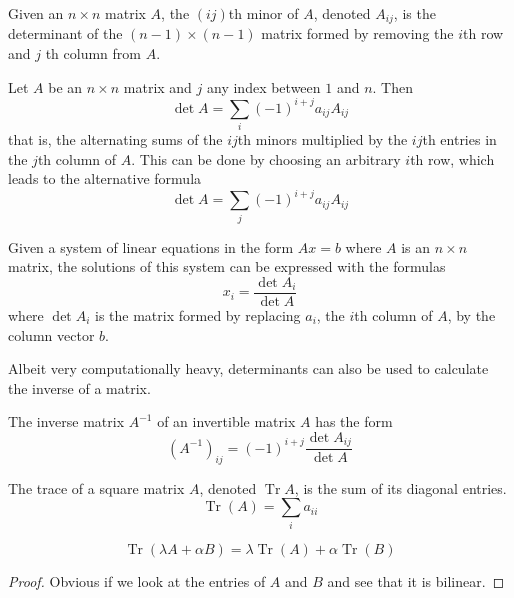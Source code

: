 \documentclass{article}
\DeclareMathOperator{\Tr}{Tr}
\begin{document}
  \begin{definition}
  Given an $n \times n$ matrix $A$, the $(i j)$th minor of $A$, denoted $A_{i j}$, is the determinant of the $(n-1) \times (n-1)$ matrix formed by removing the $i$th row and $j$ th column from $A$. 
  \end{definition}

  \begin{theorem}
  Let $A$ be an $n \times n$ matrix and $j$ any index between $1$ and $n$. Then
  \[\det{A} = \sum_i (-1)^{i + j} a_{i j} A_{i j}\]
  that is, the alternating sums of the $ij$th minors multiplied by the $ij$th entries in the $j$th column of $A$. This can be done by choosing an arbitrary $i$th row, which leads to the alternative formula 
  \[\det{A} = \sum_j (-1)^{i + j} a_{i j} A_{i j} \]
  \end{theorem}

  \begin{theorem}
  Given a system of linear equations in the form $A x = b$ where $A$ is an $n \times n$ matrix, the solutions of this system can be expressed with the formulas 
  \[ x_i = \frac{ \det{A_i}}{\det{A}}\]
  where $\det{A_i}$ is the matrix formed by replacing $a_i$, the $i$th column of $A$, by the column vector $b$. 
  \end{theorem}

  Albeit very computationally heavy, determinants can also be used to calculate the inverse of a matrix. 

  \begin{theorem}
  The inverse matrix $A^{-1}$ of an invertible matrix $A$ has the form 
  \[(A^{-1})_{i j} = (-1)^{i+j} \frac{\det{A_{i j}}}{\det{A}}\]
  \end{theorem}

  \begin{definition}
  The trace of a square matrix $A$, denoted $\Tr{A}$, is the sum of its diagonal entries. 
  \[\Tr(A) = \sum_{i} a_{ii}\]
  \end{definition}

  \begin{proposition}
  \[\Tr(\lambda A + \alpha B) = \lambda \Tr(A) + \alpha \Tr(B)\]
  \end{proposition}
  \begin{proof}
  Obvious if we look at the entries of $A$ and $B$ and see that it is bilinear.
  \end{proof}
\end{document}
